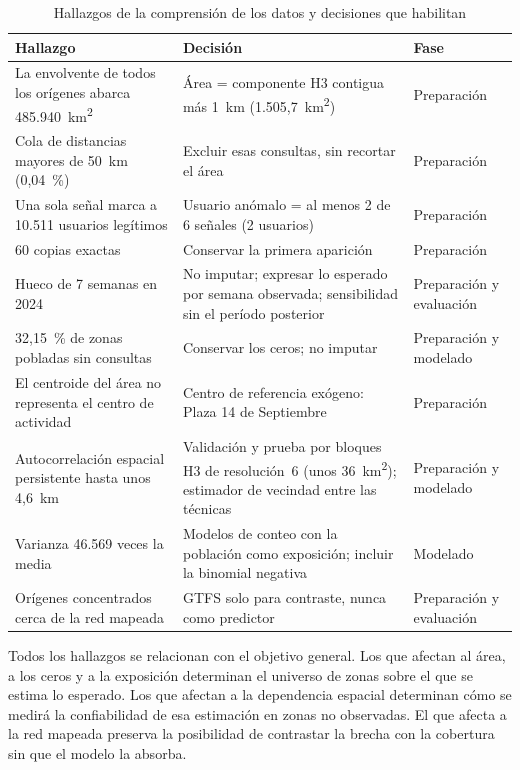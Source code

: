 \begin{table}[H]
  \centering
  \caption{Hallazgos de la comprensión de los datos y decisiones que habilitan}
  \label{tab:trazabilidad-hallazgos}
  \interlineadoSimple
  \small
  \begin{tabularx}{\textwidth}{@{}L{0.30\textwidth}YL{0.16\textwidth}@{}}
    \toprule
    \textbf{Hallazgo} & \textbf{Decisión} & \textbf{Fase} \\
    \midrule
    La envolvente de todos los orígenes abarca 485.940~km\textsuperscript{2} & Área = componente H3 contigua más 1~km (1.505,7~km\textsuperscript{2}) & Preparación \\
    Cola de distancias mayores de 50~km (0,04~\%) & Excluir esas consultas, sin recortar el área & Preparación \\
    Una sola señal marca a 10.511 usuarios legítimos & Usuario anómalo = al menos 2 de 6 señales (2 usuarios) & Preparación \\
    60 copias exactas & Conservar la primera aparición & Preparación \\
    Hueco de 7 semanas en 2024 & No imputar; expresar lo esperado por semana observada; sensibilidad sin el período posterior & Preparación y evaluación \\
    32,15~\% de zonas pobladas sin consultas & Conservar los ceros; no imputar & Preparación y modelado \\
    El centroide del área no representa el centro de actividad & Centro de referencia exógeno: Plaza 14 de Septiembre & Preparación \\
    Autocorrelación espacial persistente hasta unos 4,6~km & Validación y prueba por bloques H3 de resolución~6 (unos 36~km\textsuperscript{2}); estimador de vecindad entre las técnicas & Preparación y modelado \\
    Varianza 46.569 veces la media & Modelos de conteo con la población como exposición; incluir la binomial negativa & Modelado \\
    Orígenes concentrados cerca de la red mapeada & GTFS solo para contraste, nunca como predictor & Preparación y evaluación \\
    \bottomrule
  \end{tabularx}
\end{table}

Todos los hallazgos se relacionan con el objetivo general. Los que afectan al área, a los
ceros y a la exposición determinan el universo de zonas sobre el que se estima lo
esperado. Los que afectan a la dependencia espacial determinan cómo se medirá la
confiabilidad de esa estimación en zonas no observadas. El que afecta a la red mapeada
preserva la posibilidad de contrastar la brecha con la cobertura sin que el modelo la
absorba.

